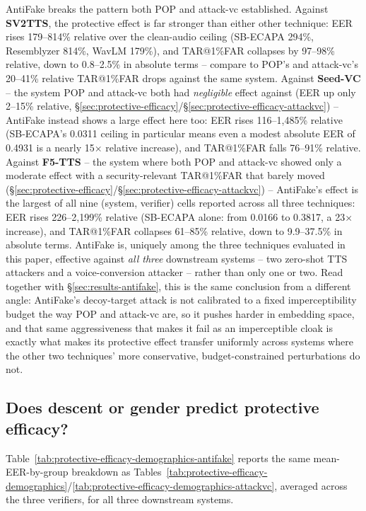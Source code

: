 \documentclass[11pt]{article}
\begin{document}
AntiFake breaks the pattern both POP and attack-vc established.
Against \textbf{SV2TTS}, the protective effect is far stronger than
either other technique: EER rises 179--814\% relative over the
clean-audio ceiling (SB-ECAPA 294\%, Resemblyzer 814\%, WavLM 179\%),
and TAR@1\%FAR collapses by 97--98\% relative, down to 0.8--2.5\% in
absolute terms -- compare to POP's and attack-vc's 20--41\% relative
TAR@1\%FAR drops against the same system. Against \textbf{Seed-VC} --
the system POP and attack-vc both had \emph{negligible} effect against
(EER up only 2--15\% relative, \S\ref{sec:protective-efficacy}/\S\ref{sec:protective-efficacy-attackvc})
-- AntiFake instead shows a large effect here too: EER rises
116--1{,}485\% relative (SB-ECAPA's 0.0311 ceiling in particular means
even a modest absolute EER of 0.4931 is a nearly 15$\times$ relative
increase), and TAR@1\%FAR falls 76--91\% relative. Against
\textbf{F5-TTS} -- the system where both POP and attack-vc showed only
a moderate effect with a security-relevant TAR@1\%FAR that barely moved
(\S\ref{sec:protective-efficacy}/\S\ref{sec:protective-efficacy-attackvc})
-- AntiFake's effect is the largest of all nine (system, verifier)
cells reported across all three techniques: EER rises 226--2{,}199\%
relative (SB-ECAPA alone: from 0.0166 to 0.3817, a 23$\times$ increase),
and TAR@1\%FAR collapses 61--85\% relative, down to 9.9--37.5\% in
absolute terms. AntiFake is, uniquely among the three techniques
evaluated in this paper, effective against \emph{all three} downstream
systems -- two zero-shot TTS attackers and a voice-conversion attacker
-- rather than only one or two. Read together with
\S\ref{sec:results-antifake}, this is the same conclusion from a
different angle: AntiFake's decoy-target attack is not calibrated to a
fixed imperceptibility budget the way POP and attack-vc are, so it
pushes harder in embedding space, and that same aggressiveness that
makes it fail as an imperceptible cloak is exactly what makes its
protective effect transfer uniformly across systems where the other two
techniques' more conservative, budget-constrained perturbations do not.

\subsection{Does descent or gender predict protective efficacy?}
\label{sec:protective-efficacy-demographics-antifake}

Table~\ref{tab:protective-efficacy-demographics-antifake} reports the
same mean-EER-by-group breakdown as
Tables~\ref{tab:protective-efficacy-demographics}/\ref{tab:protective-efficacy-demographics-attackvc},
averaged across the three verifiers, for all three downstream systems.
\end{document}

